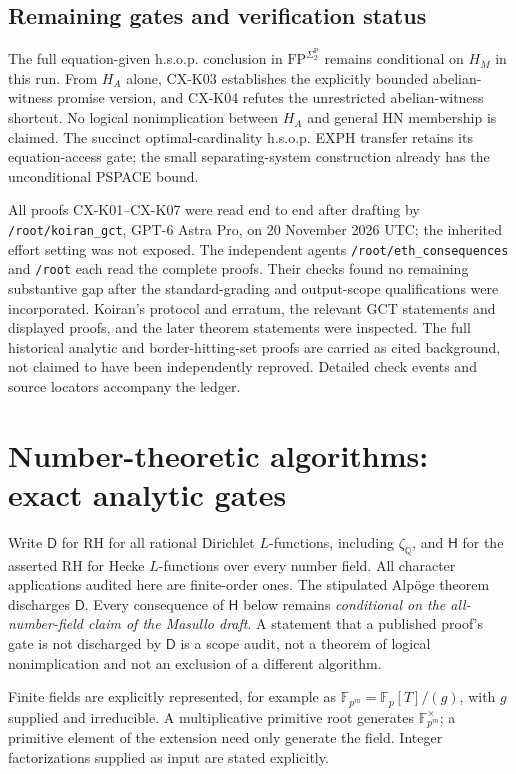 \documentclass[11pt,a4paper]{article}
\begin{document}
\subsection{Remaining gates and verification status}

The full equation-given h.s.o.p. conclusion in
$\mathrm{FP}^{\Sigma_2^{\mathrm P}}$ remains conditional on $H_M$
in this run. From $H_A$ alone, CX-K03 establishes the explicitly
bounded abelian-witness promise version, and CX-K04 refutes the
unrestricted abelian-witness shortcut. No logical nonimplication
between $H_A$ and general HN membership is claimed. The succinct
optimal-cardinality h.s.o.p. EXPH transfer retains its equation-access
gate; the small separating-system construction already has the
unconditional PSPACE bound.

All proofs CX-K01--CX-K07 were read end to end after drafting by
\texttt{/root/koiran\_gct}, GPT-6 Astra Pro, on 20 November 2026 UTC;
the inherited effort setting was not exposed. The independent agents
\texttt{/root/eth\_consequences} and \texttt{/root} each read the
complete proofs. Their checks found no remaining substantive gap after
the standard-grading and output-scope qualifications were incorporated.
Koiran's protocol and erratum, the relevant GCT statements and displayed
proofs, and the later theorem statements were inspected. The full
historical analytic and border-hitting-set proofs are carried as cited
background, not claimed to have been independently reproved. Detailed
check events and source locators accompany the ledger.


\section{Number-theoretic algorithms: exact analytic gates}
\label{sec:number-algorithms}

Write \(\mathsf D\) for RH for all rational Dirichlet \(L\)-functions,
including \(\zeta_{\mathbb Q}\), and \(\mathsf H\) for the asserted RH for
Hecke \(L\)-functions over every number field. All character applications audited here are finite-order ones. The stipulated
Alp\"oge theorem discharges \(\mathsf D\). Every consequence of
\(\mathsf H\) below remains \emph{conditional on the all-number-field
claim of the Masullo draft}. A statement that a published proof's gate is
not discharged by \(\mathsf D\) is a scope audit, not a theorem of logical
nonimplication and not an exclusion of a different algorithm.

Finite fields are explicitly represented, for example as
\(\mathbb F_{p^m}=\mathbb F_p[T]/(g)\), with \(g\) supplied and irreducible.
A multiplicative primitive root generates \(\mathbb F_{p^m}^{\times}\);
a primitive element of the extension need only generate the field.
Integer factorizations supplied as input are stated explicitly.
\end{document}
